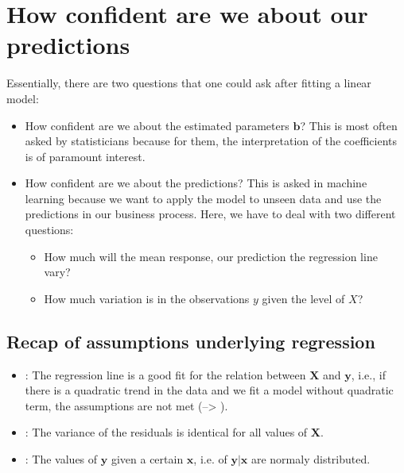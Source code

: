 \documentclass[letterpaper,10pt,english]{jupyterBook}
\begin{document}
\chapter{How confident are we about our predictions}
\label{\detokenize{Regression_Techniques:how-confident-are-we-about-our-predictions}}
\sphinxAtStartPar
Essentially, there are two questions that one could ask after fitting a linear model:
\begin{itemize}
\item {} 
\sphinxAtStartPar
How confident are we about the estimated parameters \(\mathbf{b}\)? This is most often asked by statisticians because for them, the interpretation of the coefficients is of paramount interest.

\item {} 
\sphinxAtStartPar
How confident are we about the predictions? This is asked in machine learning because we want to apply the model to unseen data and use the predictions in our business process.
Here, we have to deal with two different questions:
\begin{itemize}
\item {} 
\sphinxAtStartPar
How much will the mean response, our prediction \sphinxhyphen{} the regression line \sphinxhyphen{} vary?

\item {} 
\sphinxAtStartPar
How much variation is in the observations \(y\) given the level of \(X\)?

\end{itemize}

\end{itemize}


\section{Recap of assumptions underlying regression}
\label{\detokenize{Regression_Techniques:recap-of-assumptions-underlying-regression}}\begin{itemize}
\item {} 
\sphinxAtStartPar
{}: The regression line is a good fit for the relation between \(\mathbf{X}\) and \(\mathbf{y}\), i.e., if there is a quadratic trend in the data and we fit a model without quadratic term, the assumptions are not met (–> ).

\item {} 
\sphinxAtStartPar
{}: The variance of the residuals is identical for all values of \(\mathbf{X}\).

\item {} 
\sphinxAtStartPar
{}: The  values of \(\mathbf{y}\) given a certain \(\mathbf{x}\), i.e. of \(\mathbf{y}|\mathbf{x}\) are normaly distributed.

\end{itemize}
\end{document}

